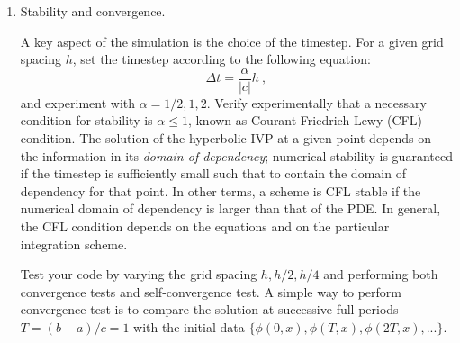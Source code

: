 \begin{enumerate}
  {\it Hint 1:} The computation of the finite differencing always require
  the presence of grid points on the left and on the right. A general strategy
  to handle this situation is to add the necessary number of points
  (``ghosts'') per direction (and dimension). These points are unphysical and should be
  filled \underline{before} computing the finite difference by copy or
  extrapolating the physical values. In case of second-order finite
  differencing stencils and periodic boundary
  conditions, one has 2 ghost points and can
  simply fill them by copying the appropriate physical values. 

  {\it Hint 2:} Count how much memory do you need with a grid of $n+2$
  points, $m$ variables and $4$ RK stage.
  In your code, input the grid size $n$, the timestep ($\alpha$, see
  below how), and the final time. Output the spatial field at
  given timesteps or iterations as a 2 columns text file $\{x,\phi(x)\}$, with name
  labelled by time. Visualization of these 1D data can be done with a
  simple program like the one at 
  \url{http://sbernuzzi.gitpages.tpi.uni-jena.de/pyg/}.
  
\item Stability and convergence.
  
  A key aspect of the simulation is the choice of the timestep. For a
  given grid spacing $h$, set the timestep according to the following equation:
  \begin{equation}
    \Delta t = \frac{\alpha}{|c|} h \ , 
  \end{equation}
  and experiment with $\alpha=1/2,1,2$.
  Verify experimentally that a necessary condition for stability is
  $\alpha\leq1$, known as Courant-Friedrich-Lewy (CFL) condition.
  The solution of the hyperbolic IVP at a
  given point depends on the information in its {\it domain of dependency};
  numerical stability is guaranteed if the timestep is sufficiently
  small such that to contain the domain of dependency for that point.
  In other terms, a scheme is CFL stable if the numerical 
  domain of dependency is larger than that of the PDE.
  In general, the CFL condition depends on the equations and on the particular
  integration scheme. 
  
  Test your code by varying the grid
  spacing $h,h/2,h/4$ and performing both convergence tests and self-convergence
  test. A simple way to perform convergence test is to compare
  the solution at successive full periods $T=(b-a)/c=1$ with the initial
  data $\{\phi(0,x),\phi(T,x),\phi(2T,x),...\}$.


\end{enumerate}
